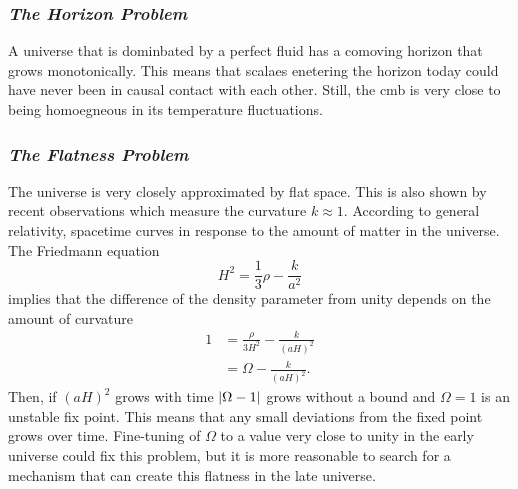 \documentclass[12pt]{article}
\begin{document}
\subsubsection{\textit{The Horizon Problem}}

A universe that is dominbated by a perfect fluid has a comoving horizon that grows monotonically. This means that scalaes enetering the horizon today could have never been in causal contact with each other. Still, the cmb is very close to being homoegneous in its temperature fluctuations. 

\subsubsection{\textit{The Flatness Problem}}
The universe is very closely approximated by flat space. This is also shown by recent observations which measure the curvature $k \approx 1$. According to general relativity, spacetime curves in response to the amount of matter in the universe. The Friedmann equation
\begin{equation}
    H^2 = \frac{1}{3}\rho - \frac{k}{a^2}
\end{equation}
implies that the difference of the density parameter from unity depends on the amount of curvature
\begin{align}
    1 &= \frac{\rho}{3H^2} - \frac{k}{(aH)^2}\\
    &= \Omega - \frac{k}{(aH)^2}.
\end{align}
Then, if $(aH)^2$ grows with time $\abs{\Omega - 1}$ grows without a bound and $\Omega = 1$ is an unstable fix point. This means that any small deviations from the fixed point grows over time. Fine-tuning of $\Omega$ to a value very close to unity in the early universe could fix this problem, but it is more reasonable to search for a mechanism that can create this flatness in the late universe. 
\end{document}
